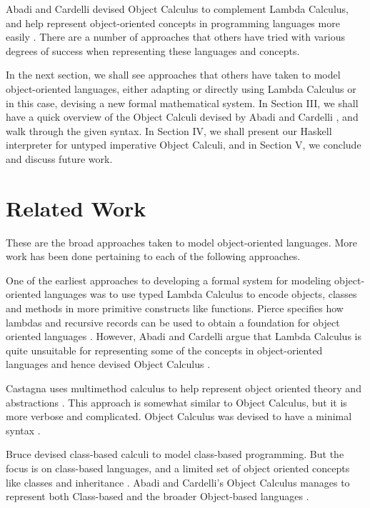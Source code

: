 \documentclass[10pt,twocolumn]{article}
\begin{document}
Abadi and Cardelli devised Object Calculus to complement Lambda Calculus, and help represent object-oriented concepts in programming languages more easily \cite{ex1,ex2,ex6,ex11}. There are a number of approaches that others have tried with various degrees of success when representing these languages and concepts. 

In the next section, we shall see approaches that others have taken to model object-oriented languages, either adapting or directly using Lambda Calculus or in this case, devising a new formal mathematical system. In Section III, we shall have a quick overview of the Object Calculi devised by Abadi and Cardelli \cite{ex11}, and walk through the given syntax. In Section IV, we shall present our Haskell interpreter for untyped imperative Object Calculi, and in Section V, we conclude and discuss future work. 

\section{Related Work}

These are the broad approaches taken to model object-oriented languages. More work has been done pertaining to each of the following approaches. 

One of the earliest approaches to developing a formal system for modeling object-oriented languages was to use typed Lambda Calculus to encode objects, classes and methods in more primitive constructs like functions. Pierce specifies how lambdas and recursive records can be used to obtain a foundation for object oriented languages \cite{ex8}. However, Abadi and Cardelli argue that Lambda Calculus is quite unsuitable for representing some of the concepts in object-oriented languages and hence devised Object Calculus \cite{ex1, ex11}. 

Castagna uses multimethod calculus to help represent object oriented theory and abstractions \cite{ex9}. This approach is somewhat similar to Object Calculus, but it is more verbose and complicated. Object Calculus was devised to have a minimal syntax \cite{ex11}. 

Bruce devised class-based calculi to model class-based programming. But the focus is on class-based languages, and a limited set of object oriented concepts like classes and inheritance \cite{ex10}. Abadi and Cardelli's Object Calculus manages to represent both Class-based and the broader Object-based languages \cite{ex1}. 
\end{document}

